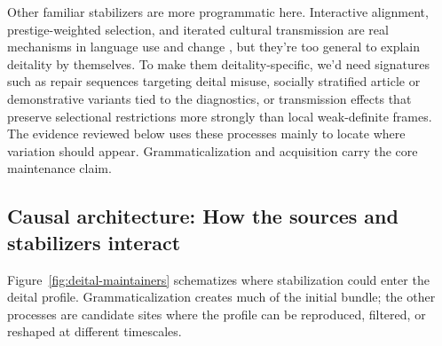 \documentclass[12pt,letterpaper]{article}
\begin{document}
Other familiar stabilizers are more programmatic here. Interactive alignment, prestige-weighted selection, and iterated cultural transmission are real mechanisms in language use and change \parencite{PickeringGarrod2004,labov2001,eckert2000,kirby2014}, but they're too general to explain deitality by themselves. To make them deitality-specific, we'd need signatures such as repair sequences targeting deital misuse, socially stratified article or demonstrative variants tied to the diagnostics, or transmission effects that preserve selectional restrictions more strongly than local weak-definite frames. The evidence reviewed below uses these processes mainly to locate where variation should appear. Grammaticalization and acquisition carry the core maintenance claim.

\subsection{Causal architecture: How the sources and stabilizers interact}


Figure~\ref{fig:deital-maintainers} schematizes where stabilization could enter the deital profile. Grammaticalization creates much of the initial bundle; the other processes are candidate sites where the profile can be reproduced, filtered, or reshaped at different timescales.
\end{document}
